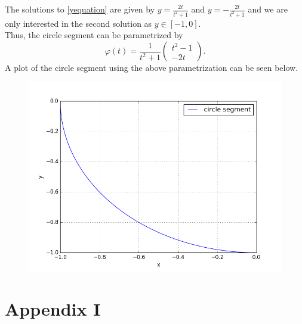 \documentclass[]{article}
\begin{document}
The solutions to \eqref{yequation} are given by $y=\frac{2t}{t^2 + 1}$ and $y=-\frac{2t}{t^2 + 1}$ and we are only interested in the second solution as $y\in[-1, 0]$.\\
Thus, the circle segment can be parametrized by \begin{equation*}
\varphi(t)=\frac{1}{t^2 + 1}\left(\begin{array}{c}
t^2 - 1\\
-2t
\end{array}\right).
\end{equation*}
A plot of the circle segment using the above parametrization can be seen below.
\begin{figure}[h!]
	\includegraphics[scale=0.6]{circlesegment}
\end{figure}

\newpage
\section*{Appendix I}

\end{document}
